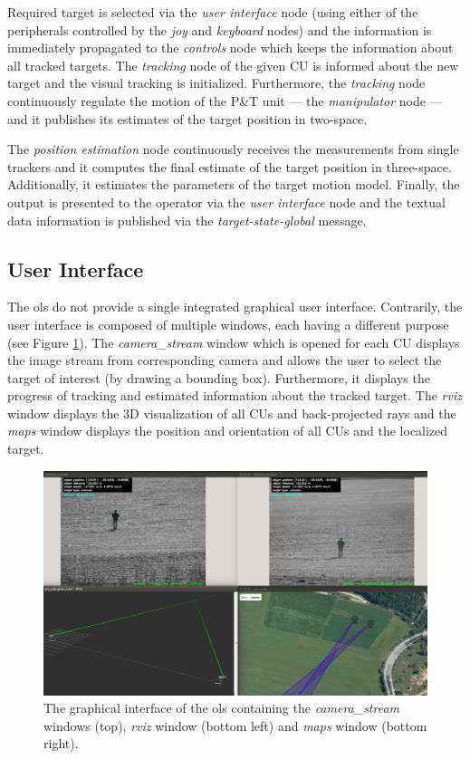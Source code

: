 Required target is selected via the \textit{user interface} node (using either of the peripherals controlled by the \textit{joy} and \textit{keyboard} nodes) and the information is immediately propagated to the \textit{controls} node which keeps the information about all tracked targets. The \textit{tracking} node of the given CU is informed about the new target and the visual tracking is initialized. Furthermore, the \textit{tracking} node continuously regulate the motion of the P\&T unit --- the \textit{manipulator} node --- and it publishes its estimates of the target position in two-space. 

The \textit{position estimation} node continuously receives the measurements from single trackers and it computes the final estimate of the target position in three-space. Additionally, it estimates the parameters of the target motion model. Finally, the output is presented to the operator via the \textit{user interface} node and the textual data information is published via the \textit{target-state-global} message.

\subsection{User Interface} \label{txt:user_interface}

The \gls{ols} do not provide a single integrated graphical user interface. Contrarily, the user interface is composed of multiple windows, each having a different purpose (see Figure \ref{fig:gui}). The \textit{camera\_stream} window which is opened for each CU displays the image stream from corresponding camera and allows the user to select the target of interest (by drawing a bounding box). Furthermore, it displays the progress of tracking and estimated information about the tracked target. The \textit{rviz} window displays the 3D visualization of all CUs and back-projected rays and the \textit{maps} window displays the position and orientation of all CUs and the localized target.

\begin{figure}[htb]
	\centering
	\includegraphics[width=0.85\linewidth]{fig/gui.png}
	\caption{The graphical interface of the \gls{ols} containing the \textit{camera\_stream} windows (top), \textit{rviz} window (bottom left) and \textit{maps} window (bottom right).}
	\label{fig:gui}
\end{figure}


